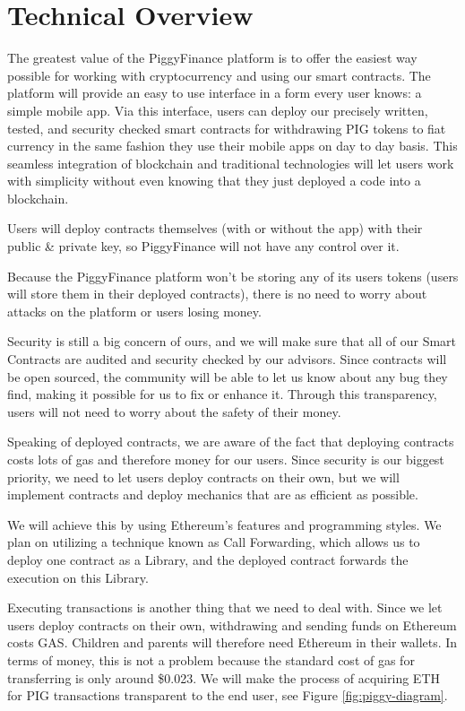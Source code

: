\documentclass[english]{article}
\begin{document}
\section{Technical Overview}
The greatest value of the PiggyFinance platform is to offer the easiest way possible for working with cryptocurrency and using our smart contracts. The platform will provide an easy to use interface in a form every user knows: a simple mobile app. Via this interface, users can deploy our precisely written, tested, and security checked smart contracts for withdrawing PIG tokens to fiat currency in the same fashion they use their mobile apps on day to day basis. This seamless integration of blockchain and traditional technologies will let users work with simplicity without even knowing that they just deployed a code into a blockchain. 

Users will deploy contracts themselves (with or without the app) with their public & private key, so PiggyFinance will not have any control over it.


Because the PiggyFinance platform won't be storing any of its users tokens (users will store them in their deployed contracts), there is no need to worry about attacks on the platform or users losing money. 

Security is still a big concern of ours, and we will make sure that all of our Smart Contracts are audited and security checked by our advisors. Since contracts will be open sourced, the community will be able to let us know about any bug they find, making it possible for us to fix or enhance it. Through this transparency, users will not need to worry about the safety of their money.

Speaking of deployed contracts, we are aware of the fact that deploying contracts costs lots of gas and therefore money for our users. Since security is our biggest priority, we need to let users deploy contracts on their own, but we will implement contracts and deploy mechanics that are as efficient as possible. 

We will achieve this by using Ethereum’s features and programming styles. We plan on utilizing a technique known as Call Forwarding, which allows us to deploy one contract as a Library, and the deployed contract forwards the execution on this Library.

Executing transactions is another thing that we need to deal with. Since we let users deploy contracts on their own, withdrawing and sending funds on Ethereum costs GAS. Children and parents will therefore need Ethereum in their wallets. In terms of money, this is not a problem because the standard cost of gas for transferring is only around \$0.023. We will make the process of acquiring ETH for PIG transactions transparent to the end user, see Figure \ref{fig:piggy-diagram}.
\end{document}
